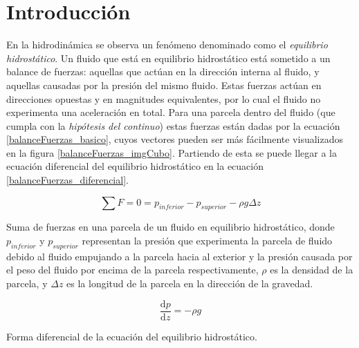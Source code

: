 \section*{Introducción}

En la hidrodinámica se observa un fenómeno denominado como el \textit{equilibrio
hidrostático}. Un fluido que está en equilibrio hidrostático está sometido a un
balance de fuerzas: aquellas que actúan en la dirección interna al fluido, y
aquellas causadas por la presión del mismo fluido. Estas fuerzas actúan en
direcciones opuestas y en magnitudes equivalentes, por lo cual el fluido no
experimenta una aceleración en total. Para una parcela dentro del fluido (que
cumpla con la \textit{hipótesis del continuo}) estas fuerzas están dadas por la
ecuación \ref{balanceFuerzas_basico}, cuyos vectores pueden ser más fácilmente
visualizados en la figura \ref{balanceFuerzas_imgCubo}. Partiendo de esta se
puede llegar a la ecuación diferencial del equilibrio hidrostático en la
ecuación \ref{balanceFuerzas_diferencial}.

\begin{equ}[!ht]
	\begin{equation} \label{balanceFuerzas_basico}
		\sum F = 0 = p_{inferior} - p_{superior} -\rho g \Delta z
	\end{equation}
	\caption{Suma de fuerzas en una parcela de un fluido en equilibrio
	hidrostático, donde \(p_{inferior}\) y \(p_{superior}\) representan la
	presión que experimenta la parcela de fluido debido al fluido empujando a la
	parcela hacia al exterior y la presión causada por el peso del fluido por
	encima de la parcela respectivamente, \(\rho\) es la densidad de la parcela,
	y \(\Delta z\) es la longitud de la parcela en la dirección de la gravedad.}
\end{equ}

\begin{equ}[!ht]
	\begin{equation} \label{balanceFuerzas_diferencial}
		\frac{\mathrm{d} p}{\mathrm{d} z} = - \rho g
	\end{equation}
	\caption{Forma diferencial de la ecuación del equilibrio hidrostático.}
\end{equ}

